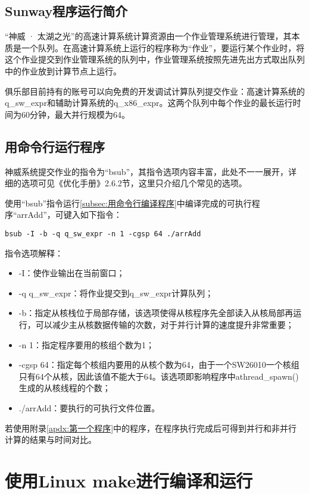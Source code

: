 \subsection{Sunway程序运行简介}
“神威 · 太湖之光”的高速计算系统计算资源由一个作业管理系统进行管理，其本质是一个队列。在高速计算系统上运行的程序称为“作业”，要运行某个作业时，将这个作业提交到作业管理系统的队列中，作业管理系统按照先进先出方式取出队列中的作业放到计算节点上运行。

俱乐部目前持有的账号可以向免费的开发调试计算队列提交作业：高速计算系统的q\_sw\_expr和辅助计算系统的q\_x86\_expr。这两个队列中每个作业的最长运行时间为60分钟，最大并行规模为64。

\subsection{用命令行运行程序}
神威系统提交作业的指令为“bsub”，其指令选项内容丰富，此处不一一展开，详细的选项可见《优化手册》2.6.2节，这里只介绍几个常见的选项。

使用“bsub”指令运行\ref{subsec:用命令行编译程序}中编译完成的可执行程序“arrAdd”，可键入如下指令：
\begin{lstlisting}
bsub -I -b -q q_sw_expr -n 1 -cgsp 64 ./arrAdd
\end{lstlisting}
指令选项解释：
\begin{itemize}
	\item -I：使作业输出在当前窗口；
	\item -q q\_sw\_expr：将作业提交到q\_sw\_expr计算队列；
	\item -b：指定从核栈位于局部存储，该选项使得从核程序先全部读入从核局部再运行，可以减少主从核数据传输的次数，对于并行计算的速度提升非常重要；
	\item -n 1：指定程序要用的核组个数为1；
	\item -cgsp 64：指定每个核组内要用的从核个数为64，由于一个SW26010一个核组只有64个从核，因此该值不能大于64。该选项即影响程序中athread\_spawn()生成的从核线程的个数；
	\item ./arrAdd：要执行的可执行文件位置。
\end{itemize}

若使用附录\ref{apdx:第一个程序}中的程序，在程序执行完成后可得到并行和非并行计算的结果与时间对比。

\section{使用Linux make进行编译和运行}
